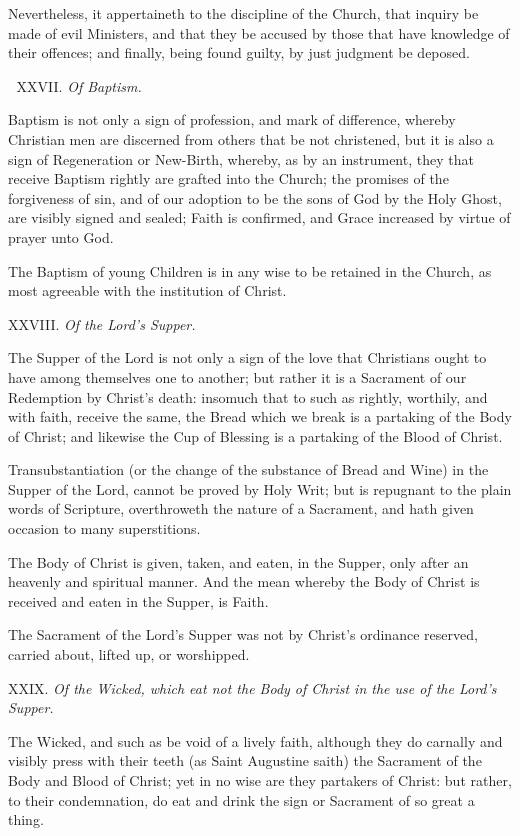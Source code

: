 Nevertheless, it appertaineth to the discipline of
the Church, that inquiry be made of evil Ministers, and that they be accused
by those that have knowledge of their offences; and finally, being found
guilty, by just judgment be deposed.


XXVII. \emph{Of Baptism.}

Baptism
is not only a sign of profession, and mark of difference, whereby Christian
men are discerned from others that be not christened, but it is also a
sign of Regeneration or New-Birth, whereby, as by an instrument, they
that receive Baptism rightly are grafted into the Church; the promises
of the forgiveness of sin, and of our adoption to be the sons of God by
the Holy Ghost, are visibly signed and sealed; Faith is confirmed, and
Grace increased by virtue of prayer unto God.

The Baptism of young Children is in any wise to be
retained in the Church, as most agreeable with the institution of Christ.

XXVIII.
\emph{Of the Lord’s Supper.}

The
Supper of the Lord is not only a sign of the love that Christians ought
to have among themselves one to another; but rather it is a Sacrament
of our Redemption by Christ’s death: insomuch that to such as rightly,
worthily, and with faith, receive the same, the Bread which we break is
a partaking of the Body of Christ; and likewise the Cup of Blessing is
a partaking of the Blood of Christ.

Transubstantiation (or the change of the substance
of Bread and Wine) in the Supper of the Lord, cannot be proved by Holy
Writ; but is repugnant to the plain words of Scripture, overthroweth the
nature of a Sacrament, and hath given occasion to many superstitions.

The Body of Christ is given, taken, and eaten, in the
Supper, only after an heavenly and spiritual manner. And the mean whereby
the Body of Christ is received and eaten in the Supper, is Faith.

The Sacrament of the Lord’s Supper was not by
Christ’s ordinance reserved, carried about, lifted up, or worshipped.

XXIX.
\emph{Of the Wicked, which eat not the Body of Christ in the use of the
Lord's Supper.}

The
Wicked, and such as be void of a lively faith, although they do carnally
and visibly press with their teeth (as Saint Augustine saith) the Sacrament
of the Body and Blood of Christ; yet in no wise are they partakers of
Christ: but rather, to their condemnation, do eat and drink the sign or
Sacrament of so great a thing.

